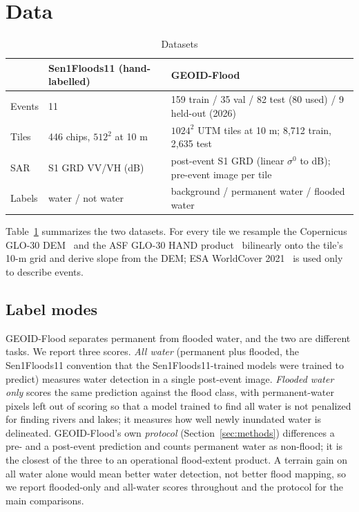 \section{Data}
\label{sec:data}

\begin{table}[t]
\caption{Datasets}
\label{tab:data}
\centering
\footnotesize
\begin{tabular}{@{}p{}p{}p{}@{}}
\toprule
 & Sen1Floods11 (hand-labelled) & GEOID-Flood \\
\midrule
Events & 11 & 159 train / 35 val / 82 test (80 used) / 9 held-out (2026) \\
Tiles & 446 chips, $512^2$ at 10 m & $1024^2$ UTM tiles at 10 m; 8,712 train, 2,635 test \\
SAR & S1 GRD VV/VH (dB) & post-event S1 GRD (linear $\sigma^0$ to dB); pre-event image per tile \\
Labels & water / not water & background / permanent water / flooded water \\
\bottomrule
\end{tabular}
\end{table}

Table~\ref{tab:data} summarizes the two datasets. For every tile we resample the Copernicus GLO-30
DEM~\cite{glo30dem} and the ASF GLO-30 HAND product~\cite{asfhand} bilinearly onto the tile's 10-m grid
and derive slope from the DEM; ESA WorldCover 2021~\cite{zanaga2022worldcover} is used only to describe
events.

\subsection{Label modes}
GEOID-Flood separates permanent from flooded water, and the two are different tasks. We report three
scores. \emph{All water} (permanent plus flooded, the Sen1Floods11 convention that the
Sen1Floods11-trained models were trained to predict) measures water detection in a single post-event image.
\emph{Flooded water only} scores the same prediction against the flood class, with permanent-water pixels
left out of scoring so that a model trained to find all water is not penalized for finding rivers and lakes;
it measures how well newly inundated water is delineated. GEOID-Flood's own \emph{protocol}
(Section~\ref{sec:methods}) differences a pre- and a post-event prediction and counts permanent water as
non-flood; it is the closest of the three to an operational flood-extent product. A terrain gain on all water
alone would mean better water detection, not better flood mapping, so we report flooded-only and all-water
scores throughout and the protocol for the main comparisons.

